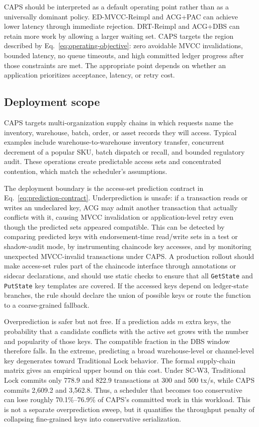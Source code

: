 \documentclass[fleqn,10pt,lineno]{wlpeerj}
\begin{document}
CAPS should be interpreted as a default operating point rather than as a universally dominant policy. ED-MVCC-Reimpl and ACG+PAC can achieve lower latency through immediate rejection. DRT-Reimpl and ACG+DBS can retain more work by allowing a larger waiting set. CAPS targets the region described by Eq.~\eqref{eq:operating-objective}: zero avoidable MVCC invalidations, bounded latency, no queue timeouts, and high committed ledger progress after those constraints are met. The appropriate point depends on whether an application prioritizes acceptance, latency, or retry cost.

\subsection*{Deployment scope}

CAPS targets multi-organization supply chains in which requests name the inventory, warehouse, batch, order, or asset records they will access. Typical examples include warehouse-to-warehouse inventory transfer, concurrent decrement of a popular SKU, batch dispatch or recall, and bounded regulatory audit. These operations create predictable access sets and concentrated contention, which match the scheduler's assumptions.

The deployment boundary is the access-set prediction contract in Eq.~\eqref{eq:prediction-contract}. Underprediction is unsafe: if a transaction reads or writes an undeclared key, ACG may admit another transaction that actually conflicts with it, causing MVCC invalidation or application-level retry even though the predicted sets appeared compatible. This can be detected by comparing predicted keys with endorsement-time read/write sets in a test or shadow-audit mode, by instrumenting chaincode key accesses, and by monitoring unexpected MVCC-invalid transactions under CAPS. A production rollout should make access-set rules part of the chaincode interface through annotations or sidecar declarations, and should use static checks to ensure that all \texttt{GetState} and \texttt{PutState} key templates are covered. If the accessed keys depend on ledger-state branches, the rule should declare the union of possible keys or route the function to a coarse-grained fallback.

Overprediction is safer but not free. If a prediction adds $m$ extra keys, the probability that a candidate conflicts with the active set grows with the number and popularity of those keys. The compatible fraction in the DBS window therefore falls. In the extreme, predicting a broad warehouse-level or channel-level key degenerates toward Traditional Lock behavior. The formal supply-chain matrix gives an empirical upper bound on this cost. Under SC-W3, Traditional Lock commits only 778.9 and 822.9 transactions at 300 and 500 tx/s, while CAPS commits 2,609.2 and 3,562.8. Thus, a scheduler that becomes too conservative can lose roughly 70.1\%--76.9\% of CAPS's committed work in this workload. This is not a separate overprediction sweep, but it quantifies the throughput penalty of collapsing fine-grained keys into conservative serialization.
\end{document}
